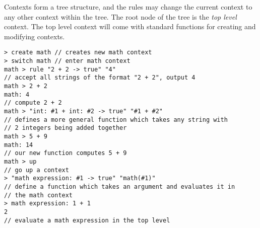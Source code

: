 \documentclass[a4paper]{article}
\begin{document}
Contexts form a tree structure, and the rules may change the current context to any other context within the tree. The root node of the tree is the \textit{top level} context. The top level context will come with standard functions for creating and modifying contexts.

\begin{lstlisting}
> create math // creates new math context
> switch math // enter math context 
math > rule "2 + 2 -> true" "4" 
// accept all strings of the format "2 + 2", output 4
math > 2 + 2
math: 4
// compute 2 + 2
math > "int: #1 + int: #2 -> true" "#1 + #2"
// defines a more general function which takes any string with 
// 2 integers being added together
math > 5 + 9
math: 14
// our new function computes 5 + 9
math > up
// go up a context
> "math expression: #1 -> true" "math(#1)"
// define a function which takes an argument and evaluates it in
// the math context
> math expression: 1 + 1
2
// evaluate a math expression in the top level
 
\end{lstlisting}
\end{document}
